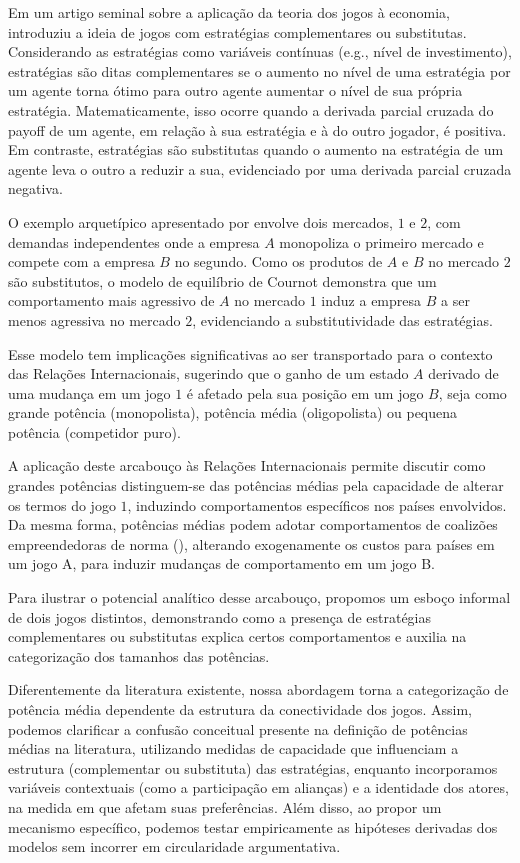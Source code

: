 \documentclass[]{interact}
\theoremstyle{plain}%
\theoremstyle{definition}
\theoremstyle{remark}
\begin{document}
Em um artigo seminal sobre a aplicação da teoria dos jogos à economia,
\citet{bulow_etal_85} introduziu a ideia de jogos com estratégias
complementares ou substitutas. Considerando as estratégias como
variáveis contínuas (e.g., nível de investimento), estratégias são ditas
complementares se o aumento no nível de uma estratégia por um agente
torna ótimo para outro agente aumentar o nível de sua própria
estratégia. Matematicamente, isso ocorre quando a derivada parcial
cruzada do payoff de um agente, em relação à sua estratégia e à do outro
jogador, é positiva. Em contraste, estratégias são substitutas quando o
aumento na estratégia de um agente leva o outro a reduzir a sua,
evidenciado por uma derivada parcial cruzada negativa.

O exemplo arquetípico apresentado por \citet{bulow_etal_1985} envolve
dois mercados, \(1\) e \(2\), com demandas independentes onde a empresa
\(A\) monopoliza o primeiro mercado e compete com a empresa \(B\) no
segundo. Como os produtos de \(A\) e \(B\) no mercado \(2\) são
substitutos, o modelo de equilíbrio de Cournot demonstra que um
comportamento mais agressivo de \(A\) no mercado \(1\) induz a empresa
\(B\) a ser menos agressiva no mercado \(2\), evidenciando a
substitutividade das estratégias.

Esse modelo tem implicações significativas ao ser transportado para o
contexto das Relações Internacionais, sugerindo que o ganho de um estado
\(A\) derivado de uma mudança em um jogo \(1\) é afetado pela sua
posição em um jogo \(B\), seja como grande potência (monopolista),
potência média (oligopolista) ou pequena potência (competidor puro).

A aplicação deste arcabouço às Relações Internacionais permite discutir
como grandes potências distinguem-se das potências médias pela
capacidade de alterar os termos do jogo \(1\), induzindo comportamentos
específicos nos países envolvidos. Da mesma forma, potências médias
podem adotar comportamentos de coalizões empreendedoras de norma
(\citet{ravenhill_2018}), alterando exogenamente os custos para países
em um jogo A, para induzir mudanças de comportamento em um jogo B.

Para ilustrar o potencial analítico desse arcabouço, propomos um esboço
informal de dois jogos distintos, demonstrando como a presença de
estratégias complementares ou substitutas explica certos comportamentos
e auxilia na categorização dos tamanhos das potências.

Diferentemente da literatura existente, nossa abordagem torna a
categorização de potência média dependente da estrutura da conectividade
dos jogos. Assim, podemos clarificar a confusão conceitual presente na
definição de potências médias na literatura, utilizando medidas de
capacidade que influenciam a estrutura (complementar ou substituta) das
estratégias, enquanto incorporamos variáveis contextuais (como a
participação em alianças) e a identidade dos atores, na medida em que
afetam suas preferências. Além disso, ao propor um mecanismo específico,
podemos testar empiricamente as hipóteses derivadas dos modelos sem
incorrer em circularidade argumentativa.
\end{document}
